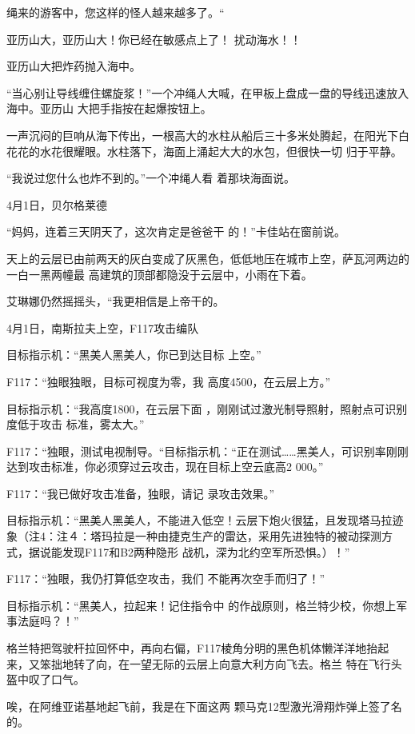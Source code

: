 \documentclass{article}
\begin{document}
绳来的游客中，您这样的怪人越来越多了。“ 

亚历山大，亚历山大！你已经在敏感点上了！
扰动海水！！ 


亚历山大把炸药抛入海中。 

“当心别让导线缠住螺旋浆！”一个冲绳人大喊，在甲板上盘成一盘的导线迅速放入海中。亚历山
大把手指按在起爆按钮上。 


一声沉闷的巨响从海下传出，一根高大的水柱从船后三十多米处腾起，在阳光下白花花的水花很耀眼。水柱落下，海面上涌起大大的水包，但很快一切
归于平静。 

“我说过您什么也炸不到的。”一个冲绳人看
着那块海面说。 


\newpage


4月1日，贝尔格莱德 

“妈妈，连着三天阴天了，这次肯定是爸爸干
的！”卡佳站在窗前说。 

天上的云层已由前两天的灰白变成了灰黑色，低低地压在城市上空，萨瓦河两边的一白一黑两幢最
高建筑的顶部都隐没于云层中，小雨在下着。 

艾琳娜仍然摇摇头，“我更相信是上帝干的。


4月1日，南斯拉夫上空，F117攻击编队

目标指示机：“黑美人黑美人，你已到达目标
上空。” 

F117：“独眼独眼，目标可视度为零，我
高度4500，在云层上方。” 

目标指示机：“我高度1800，在云层下面
\newpage
，刚刚试过激光制导照射，照射点可识别度低于攻击
标准，雾太大。” 

F117：“独眼，测试电视制导。“目标指示机：“正在测试……黑美人，可识别率刚刚达到攻击标准，你必须穿过云攻击，现在目标上空云底高2
000。” 

F117：“我已做好攻击准备，独眼，请记
录攻击效果。” 

目标指示机：“黑美人黑美人，不能进入低空！云层下炮火很猛，且发现塔马拉迹象（注4：注４：塔玛拉是一种由捷克生产的雷达，采用先进独特的被动探测方式，据说能发现F117和B2两种隐形
战机，深为北约空军所恐惧。）！” 

F117：“独眼，我仍打算低空攻击，我们
不能再次空手而归了！” 

目标指示机：“黑美人，拉起来！记住指令中
\newpage
的作战原则，格兰特少校，你想上军事法庭吗？！”

格兰特把驾驶杆拉回怀中，再向右偏，F117棱角分明的黑色机体懒洋洋地抬起来，又笨拙地转了向，在一望无际的云层上向意大利方向飞去。格兰
特在飞行头盔中叹了口气。 

唉，在阿维亚诺基地起飞前，我是在下面这两
颗马克12型激光滑翔炸弹上签了名的。 
\end{document}
